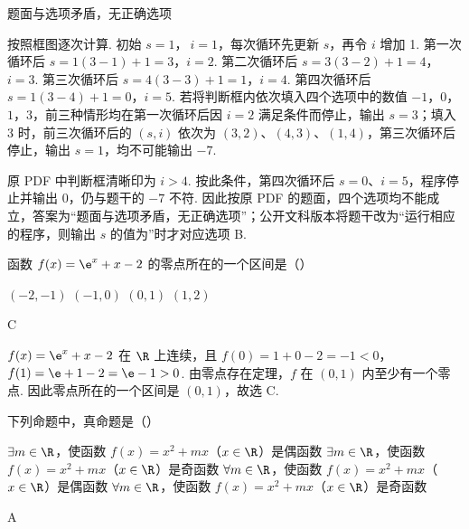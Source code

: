 \begin{answer}
题面与选项矛盾，无正确选项
\end{answer}

\begin{solution}
按照框图逐次计算. 初始 \(s=1\)，\(\ i=1\)，每次循环先更新 \(s\)，再令 \(i\) 增加 1. 第一次循环后
\(s=1(3-1)+1=3\)，\(i=2\).
第二次循环后
\(s=3(3-2)+1=4\)，\(i=3\).
第三次循环后
\(s=4(3-3)+1=1\)，\(i=4\).
第四次循环后
\(s=1(3-4)+1=0\)，\(i=5\).
若将判断框内依次填入四个选项中的数值 \(-1\)，\(0\)，\(1\)，\(3\)，前三种情形均在第一次循环后因 \(i=2\) 满足条件而停止，输出 \(s=3\)；填入 \(3\) 时，前三次循环后的 \((s,i)\) 依次为 \((3,2)\)、\((4,3)\)、\((1,4)\)，第三次循环后停止，输出 \(s=1\)，均不可能输出 \(-7\).

原 PDF 中判断框清晰印为 \(i>4\). 按此条件，第四次循环后 \(s=0\)、\(i=5\)，程序停止并输出 \(0\)，仍与题干的 \(-7\) 不符. 因此按原 PDF 的题面，四个选项均不能成立，答案为“题面与选项矛盾，无正确选项”；公开文科版本将题干改为“运行相应的程序，则输出 \(s\) 的值为”时才对应选项 B.
\end{solution}

\begin{problem}
函数 \(f(x) = \e^{x} + x - 2\) 的零点所在的一个区间是（\quad）

\choices
    {\((-2,-1)\)}
    {\((-1,0)\)}
    {\((0,1)\)}
    {\((1,2)\)}
\end{problem}

\begin{answer}
C
\end{answer}

\begin{solution}
\(f(x)=\e^x+x-2\) 在 \(\R\) 上连续，且
\(f(0)=1+0-2=-1<0\)，\(f(1)=\e+1-2=\e-1>0\).
由零点存在定理，\(f\) 在 \((0,1)\) 内至少有一个零点. 因此零点所在的一个区间是 \((0,1)\)，故选 C.
\end{solution}

\begin{problem}
下列命题中，真命题是（\quad）

\choices
    {\(\exists m \in \R\)，使函数 \(f(x) = x^{2} + mx\)（\(x \in \R\)）是偶函数}
    {\(\exists m \in \R\)，使函数 \(f(x) = x^{2} + mx\)（\(x \in \R\)）是奇函数}
    {\(\forall m \in \R\)，使函数 \(f(x) = x^{2} + mx\)（\(x \in \R\)）是偶函数}
    {\(\forall m \in \R\)，使函数 \(f(x) = x^{2} + mx\)（\(x \in \R\)）是奇函数}
\end{problem}

\begin{answer}
A
\end{answer}

